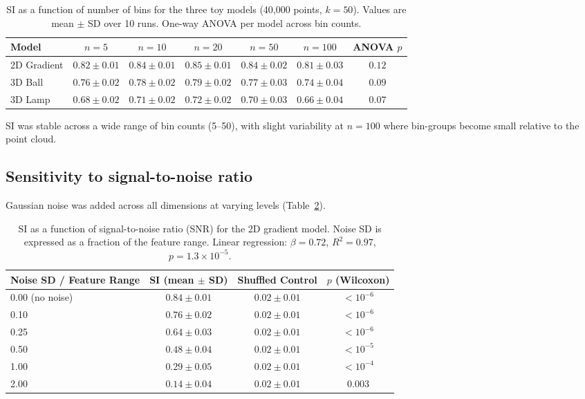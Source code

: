 \documentclass[11pt]{article}
\begin{document}
\begin{table}[H]
\centering
\caption{SI as a function of number of bins for the three toy models (40{,}000 points, $k = 50$). Values are mean $\pm$ SD over 10 runs. One-way ANOVA per model across bin counts.}
\label{tab:bins}
\begin{tabular}{lcccccc}
\toprule
\textbf{Model} & \textbf{$n=5$} & \textbf{$n=10$} & \textbf{$n=20$} & \textbf{$n=50$} & \textbf{$n=100$} & \textbf{ANOVA $p$} \\
\midrule
2D Gradient & $0.82 \pm 0.01$ & $0.84 \pm 0.01$ & $0.85 \pm 0.01$ & $0.84 \pm 0.02$ & $0.81 \pm 0.03$ & $0.12$ \\
3D Ball & $0.76 \pm 0.02$ & $0.78 \pm 0.02$ & $0.79 \pm 0.02$ & $0.77 \pm 0.03$ & $0.74 \pm 0.04$ & $0.09$ \\
3D Lamp & $0.68 \pm 0.02$ & $0.71 \pm 0.02$ & $0.72 \pm 0.02$ & $0.70 \pm 0.03$ & $0.66 \pm 0.04$ & $0.07$ \\
\bottomrule
\end{tabular}
\end{table}

SI was stable across a wide range of bin counts (5--50), with slight variability at $n = 100$ where bin-groups become small relative to the point cloud.

\subsection{Sensitivity to signal-to-noise ratio}

Gaussian noise was added across all dimensions at varying levels (Table~\ref{tab:snr}).

\begin{table}[H]
\centering
\caption{SI as a function of signal-to-noise ratio (SNR) for the 2D gradient model. Noise SD is expressed as a fraction of the feature range. Linear regression: $\beta = 0.72$, $R^{2} = 0.97$, $p = 1.3 \times 10^{-5}$.}
\label{tab:snr}
\begin{tabular}{lccc}
\toprule
\textbf{Noise SD / Feature Range} & \textbf{SI (mean $\pm$ SD)} & \textbf{Shuffled Control} & \textbf{$p$ (Wilcoxon)} \\
\midrule
0.00 (no noise) & $0.84 \pm 0.01$ & $0.02 \pm 0.01$ & $< 10^{-6}$ \\
0.10 & $0.76 \pm 0.02$ & $0.02 \pm 0.01$ & $< 10^{-6}$ \\
0.25 & $0.64 \pm 0.03$ & $0.02 \pm 0.01$ & $< 10^{-6}$ \\
0.50 & $0.48 \pm 0.04$ & $0.02 \pm 0.01$ & $< 10^{-5}$ \\
1.00 & $0.29 \pm 0.05$ & $0.02 \pm 0.01$ & $< 10^{-4}$ \\
2.00 & $0.14 \pm 0.04$ & $0.02 \pm 0.01$ & $0.003$ \\
\bottomrule
\end{tabular}
\end{table}
\end{document}
